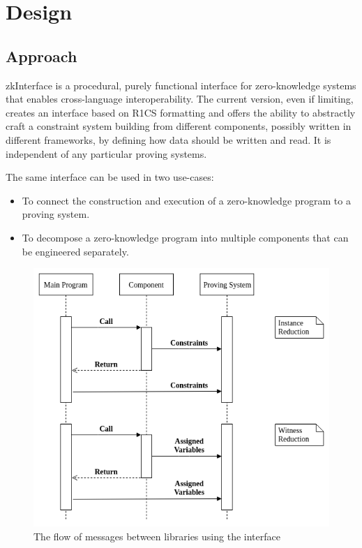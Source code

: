 \section{Design}

\subsection{Approach}

	zkInterface is a procedural, purely functional interface for zero-knowledge systems that enables cross-language interoperability. The current version, even if limiting, creates an interface based on R1CS formatting and offers the ability to abstractly craft a constraint system building from different components, possibly written in different frameworks, by defining how data should be written and read. 
	It is independent of any particular proving systems.

	The same interface can be used in two use-cases:
	\begin{itemize}
		\item To connect the construction and execution of a zero-knowledge program
			to a proving system.

		\item To decompose a zero-knowledge program into multiple components that can be engineered separately.
	\end{itemize}

\begin{figure}[h!]
	\includegraphics[width=\linewidth]{call_flow.png}
	\caption{The flow of messages between libraries using the interface}
	\label{flow}
\end{figure}


